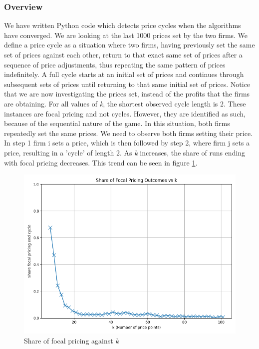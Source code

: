 \documentclass{article}
\begin{document}
\subsubsection{Overview}
We have written Python code which detects price cycles when the algorithms have converged. We are looking at the last 1000 prices set by the two firms. We define a price cycle as a situation where two firms, having previously set the same set of prices against each other, return to that exact same set of prices after a sequence of price adjustments, thus repeating the same pattern of prices indefinitely. A full cycle starts at an initial set of prices and continues through subsequent sets of prices until returning to that same initial set of prices.
Notice that we are now investigating the prices set, instead of the profits that the firms are obtaining. 
\newline
For all values of \textit{k}, the shortest observed cycle length is 2. These instances are focal pricing and not cycles. However, they are identified as such, because of the sequential nature of the game. In this situation, both firms repeatedly set the same prices. We need to observe both firms setting their price. In step 1 firm i sets a price, which is then followed by step 2, where firm j sets a price, resulting in a 'cycle' of length 2.
\newline
As \textit{k} increases, the share of runs ending with focal pricing decreases. This trend can be seen in figure \ref{fig:ShareFocalPricing}. 
\begin{figure}[H]
    \centering
    \includegraphics[scale = 0.5]{ShareFocal1000NumRuns.png}
    \caption{Share of focal pricing against \textit{k}}
    \label{fig:ShareFocalPricing}
\end{figure}
\end{document}
